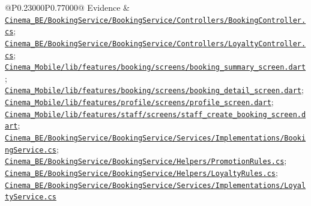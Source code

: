 \begin{longtable}{@{}P{0.23000\SRSWidth}P{0.77000\SRSWidth}@{}}
Evidence & \href{../../../Cinema\_BE/BookingService/BookingService/Controllers/BookingController.cs}{\texttt{Cinema\_\allowbreak{}BE/\allowbreak{}Booking\allowbreak{}Service/\allowbreak{}Booking\allowbreak{}Service/\allowbreak{}Controll\allowbreak{}ers/\allowbreak{}Booking\allowbreak{}Controll\allowbreak{}er.\allowbreak{}cs}}; \href{../../../Cinema\_BE/BookingService/BookingService/Controllers/LoyaltyController.cs}{\texttt{Cinema\_\allowbreak{}BE/\allowbreak{}Booking\allowbreak{}Service/\allowbreak{}Booking\allowbreak{}Service/\allowbreak{}Controll\allowbreak{}ers/\allowbreak{}Loyalty\allowbreak{}Controll\allowbreak{}er.\allowbreak{}cs}}; \href{../../../Cinema\_Mobile/lib/features/booking/screens/booking\_summary\_screen.dart}{\texttt{Cinema\_\allowbreak{}Mobile/\allowbreak{}lib/\allowbreak{}features\allowbreak{}/\allowbreak{}booking/\allowbreak{}screens/\allowbreak{}booking\_\allowbreak{}summary\_\allowbreak{}screen.\allowbreak{}dart}}; \href{../../../Cinema\_Mobile/lib/features/booking/screens/booking\_detail\_screen.dart}{\texttt{Cinema\_\allowbreak{}Mobile/\allowbreak{}lib/\allowbreak{}features\allowbreak{}/\allowbreak{}booking/\allowbreak{}screens/\allowbreak{}booking\_\allowbreak{}detail\_\allowbreak{}screen.\allowbreak{}dart}}; \href{../../../Cinema\_Mobile/lib/features/profile/screens/profile\_screen.dart}{\texttt{Cinema\_\allowbreak{}Mobile/\allowbreak{}lib/\allowbreak{}features\allowbreak{}/\allowbreak{}profile/\allowbreak{}screens/\allowbreak{}profile\_\allowbreak{}screen.\allowbreak{}dart}}; \href{../../../Cinema\_Mobile/lib/features/staff/screens/staff\_create\_booking\_screen.dart}{\texttt{Cinema\_\allowbreak{}Mobile/\allowbreak{}lib/\allowbreak{}features\allowbreak{}/\allowbreak{}staff/\allowbreak{}screens/\allowbreak{}staff\_\allowbreak{}create\_\allowbreak{}booking\_\allowbreak{}screen.\allowbreak{}dart}}; \href{../../../Cinema\_BE/BookingService/BookingService/Services/Implementations/BookingService.cs}{\texttt{Cinema\_\allowbreak{}BE/\allowbreak{}Booking\allowbreak{}Service/\allowbreak{}Booking\allowbreak{}Service/\allowbreak{}Services\allowbreak{}/\allowbreak{}Implemen\allowbreak{}tations/\allowbreak{}Booking\allowbreak{}Service.\allowbreak{}cs}}; \href{../../../Cinema\_BE/BookingService/BookingService/Helpers/PromotionRules.cs}{\texttt{Cinema\_\allowbreak{}BE/\allowbreak{}Booking\allowbreak{}Service/\allowbreak{}Booking\allowbreak{}Service/\allowbreak{}Helpers/\allowbreak{}Promotio\allowbreak{}n\allowbreak{}Rules.\allowbreak{}cs}}; \href{../../../Cinema\_BE/BookingService/BookingService/Helpers/LoyaltyRules.cs}{\texttt{Cinema\_\allowbreak{}BE/\allowbreak{}Booking\allowbreak{}Service/\allowbreak{}Booking\allowbreak{}Service/\allowbreak{}Helpers/\allowbreak{}Loyalty\allowbreak{}Rules.\allowbreak{}cs}}; \href{../../../Cinema\_BE/BookingService/BookingService/Services/Implementations/LoyaltyService.cs}{\texttt{Cinema\_\allowbreak{}BE/\allowbreak{}Booking\allowbreak{}Service/\allowbreak{}Booking\allowbreak{}Service/\allowbreak{}Services\allowbreak{}/\allowbreak{}Implemen\allowbreak{}tations/\allowbreak{}Loyalty\allowbreak{}Service.\allowbreak{}cs}} \\[3pt]

\end{longtable}

